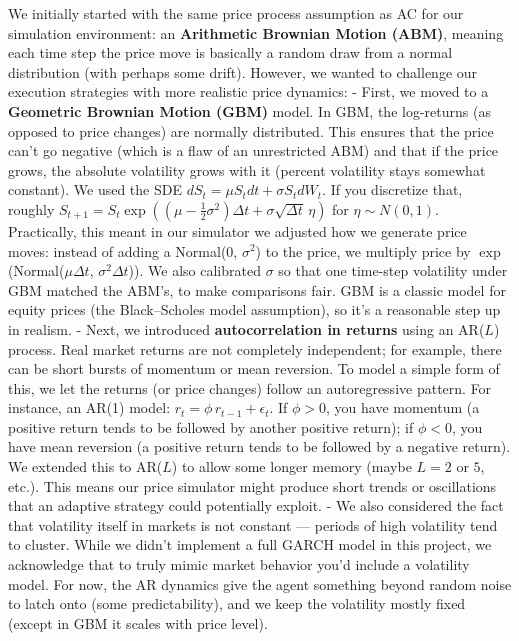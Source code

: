 \documentclass[11pt]{article}
\begin{document}
		We initially started with the same price process assumption as AC for our simulation environment: an \textbf{Arithmetic Brownian Motion (ABM)}, meaning each time step the price move is basically a random draw from a normal distribution (with perhaps some drift). However, we wanted to challenge our execution strategies with more realistic price dynamics:
		- First, we moved to a \textbf{Geometric Brownian Motion (GBM)} model. In GBM, the log-returns (as opposed to price changes) are normally distributed. This ensures that the price can’t go negative (which is a flaw of an unrestricted ABM) and that if the price grows, the absolute volatility grows with it (percent volatility stays somewhat constant). We used the SDE $dS_t = \mu S_t dt + \sigma S_t dW_t$. If you discretize that, roughly $S_{t+1} = S_t \exp((\mu - \frac{1}{2}\sigma^2)\Delta t + \sigma \sqrt{\Delta t}\,\eta)$ for $\eta \sim N(0,1)$. Practically, this meant in our simulator we adjusted how we generate price moves: instead of adding a Normal(0, $\sigma^2$) to the price, we multiply price by $\exp$(Normal($\mu\Delta t$, $\sigma^2 \Delta t$)). We also calibrated $\sigma$ so that one time-step volatility under GBM matched the ABM’s, to make comparisons fair. GBM is a classic model for equity prices (the Black–Scholes model assumption), so it’s a reasonable step up in realism.
		- Next, we introduced \textbf{autocorrelation in returns} using an AR($L$) process. Real market returns are not completely independent; for example, there can be short bursts of momentum or mean reversion. To model a simple form of this, we let the returns (or price changes) follow an autoregressive pattern. For instance, an AR(1) model: $r_t = \phi\, r_{t-1} + \epsilon_t$. If $\phi > 0$, you have momentum (a positive return tends to be followed by another positive return); if $\phi < 0$, you have mean reversion (a positive return tends to be followed by a negative return). We extended this to AR($L$) to allow some longer memory (maybe $L=2$ or $5$, etc.). This means our price simulator might produce short trends or oscillations that an adaptive strategy could potentially exploit.
		- We also considered the fact that volatility itself in markets is not constant — periods of high volatility tend to cluster. While we didn’t implement a full GARCH model in this project, we acknowledge that to truly mimic market behavior you’d include a volatility model. For now, the AR dynamics give the agent something beyond random noise to latch onto (some predictability), and we keep the volatility mostly fixed (except in GBM it scales with price level). 
		
\end{document}
